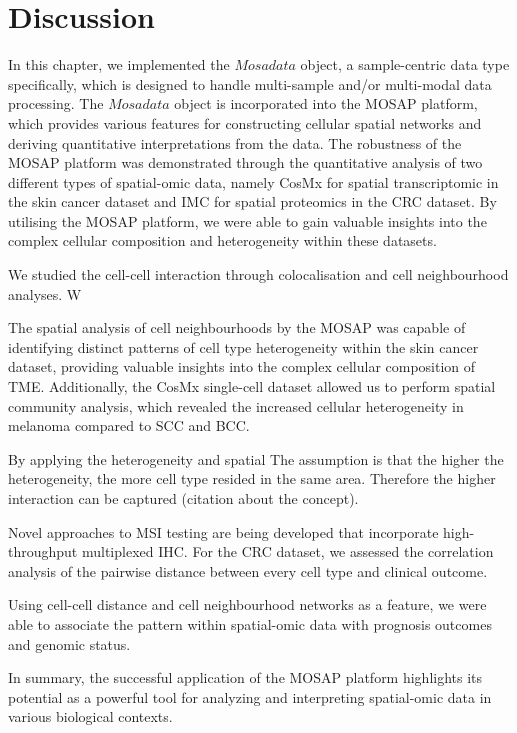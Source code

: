 \section{Discussion}
In this chapter, we implemented the $Mosadata$ object, a sample-centric data type specifically, which is designed to handle multi-sample and/or multi-modal data processing. The $Mosadata$ object is incorporated into the MOSAP platform, which provides various features for constructing cellular spatial networks and deriving quantitative interpretations from the data. The robustness of the MOSAP platform was demonstrated through the quantitative analysis of two different types of spatial-omic data, namely CosMx for spatial transcriptomic in the skin cancer dataset and IMC for spatial proteomics in the CRC dataset. By utilising the MOSAP platform, we were able to gain valuable insights into the complex cellular composition and heterogeneity within these datasets. 

We studied the cell-cell interaction through colocalisation and cell neighbourhood analyses. W

The spatial analysis of cell neighbourhoods by the MOSAP was capable of identifying distinct patterns of cell type heterogeneity within the skin cancer dataset, providing valuable insights into the complex cellular composition of TME. Additionally, the CosMx single-cell dataset allowed us to perform spatial community analysis, which revealed the increased cellular heterogeneity in melanoma compared to SCC and BCC. 

By applying the heterogeneity and spatial The assumption is that the higher the heterogeneity, the more cell type resided in the same area. Therefore the higher interaction can be captured (citation about the concept).

Novel approaches to MSI testing are being developed that incorporate high-throughput multiplexed IHC. For the CRC dataset, we assessed the correlation analysis of the pairwise distance between every cell type and clinical outcome. 

Using cell-cell distance and cell neighbourhood networks as a feature, we were able to associate the pattern within spatial-omic data with prognosis outcomes and genomic status. 

In summary, the successful application of the MOSAP platform highlights its potential as a powerful tool for analyzing and interpreting spatial-omic data in various biological contexts.

